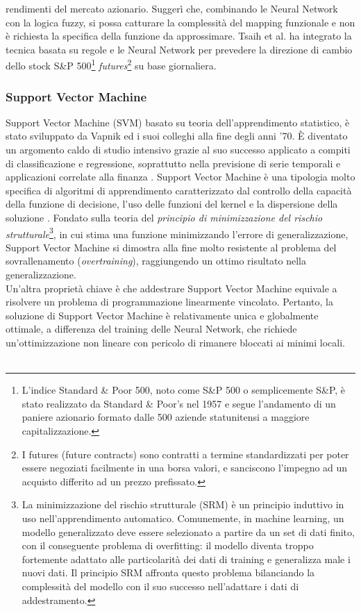 \documentclass[a4paper,12pt]{report}
\begin{document}
rendimenti del mercato azionario. Suggerì che, combinando le Neural Network con la logica fuzzy, si possa catturare la complessità del mapping funzionale e non è richiesta la specifica della funzione da approssimare. Tsaih et al. \cite{41} ha integrato la tecnica basata su regole e le Neural Network per prevedere la direzione di cambio dello stock S\&P 500\footnote{L'indice Standard \& Poor 500, noto come S\&P 500 o semplicemente S\&P, è stato realizzato da Standard \& Poor's nel 1957 e segue l'andamento di un paniere azionario formato dalle 500 aziende statunitensi a maggiore capitalizzazione.} \textit{futures}\footnote{I futures (future contracts) sono contratti a termine standardizzati per poter essere negoziati facilmente in una borsa valori, e sanciscono l'impegno ad un acquisto differito ad un prezzo prefissato. } su base giornaliera.

\subsubsection{Support Vector Machine}
Support Vector Machine (SVM) basato su teoria dell'apprendimento statistico, è stato sviluppato da Vapnik \cite{44} ed i suoi colleghi alla fine degli anni '70. È diventato un argomento caldo di studio intensivo grazie al suo successo applicato a compiti di classificazione e regressione, soprattutto nella previsione di serie temporali e applicazioni correlate alla finanza \cite{46}. Support Vector Machine è una tipologia molto specifica di algoritmi di apprendimento caratterizzato dal controllo della capacità della funzione di decisione, l'uso delle funzioni del kernel e la dispersione della soluzione \cite{43}. Fondato sulla teoria del \textit{principio di minimizzazione del rischio strutturale}\footnote{La minimizzazione del rischio strutturale (SRM) è un principio induttivo in uso nell'apprendimento automatico. Comunemente, in machine learning, un modello generalizzato deve essere selezionato a partire da un set di dati finito, con il conseguente problema di overfitting: il modello diventa troppo fortemente adattato alle particolarità dei dati di training e generalizza male i nuovi dati. Il principio SRM affronta questo problema bilanciando la complessità del modello con il suo successo nell'adattare i dati di addestramento.}, in cui stima una funzione minimizzando l'errore di generalizzazione, Support Vector Machine si dimostra alla fine molto resistente al problema del sovrallenamento (\textit{overtraining}), raggiungendo un ottimo risultato nella generalizzazione.\\ Un'altra proprietà chiave è che addestrare Support Vector Machine equivale a risolvere un problema di programmazione linearmente vincolato. Pertanto, la soluzione di Support Vector Machine è relativamente unica e globalmente ottimale, a differenza del training delle Neural Network, che richiede un'ottimizzazione non lineare con pericolo di rimanere bloccati ai minimi locali.\\~\\ 
\end{document}
